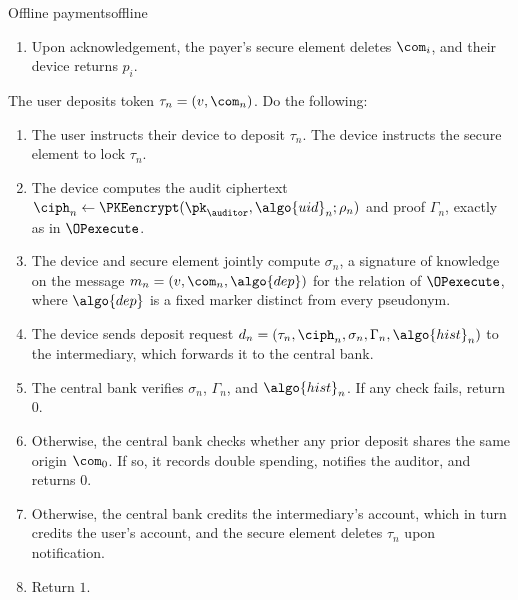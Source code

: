 \begin{protocolbox}{Offline payments}{offline}
\begin{description}
\begin{enumerate}
        \item Upon acknowledgement, the payer's secure element deletes
          $\com_i$, and their device returns $p_i$.

      \end{enumerate}

    \item[$\{0,1\} \sample \OPdeposit(\tau_n, \algo{hist}_n)$ :] The user
      deposits token $\tau_n = (v, \com_n)$. Do the following:

      \begin{enumerate}

        \item The user instructs their device to deposit $\tau_n$. The device
          instructs the secure element to lock $\tau_n$.

        \item The device computes the audit ciphertext $\ciph_n \leftarrow
          \PKEencrypt(\pk_\auditor, \algo{uid}_n; \rho_n)$ and proof
          $\Gamma_n$, exactly as in $\OPexecute$.

        \item The device and secure element jointly compute $\sigma_n$, a
          signature of knowledge on the message $m_n = (v, \com_n, \algo{dep})$
          for the relation of $\OPexecute$, where $\algo{dep}$ is a fixed
          marker distinct from every pseudonym.

        \item The device sends deposit request $d_n = (\tau_n, \ciph_n,
          \sigma_n, \Gamma_n, \algo{hist}_n)$ to the intermediary, which
          forwards it to the central bank.

        \item The central bank verifies $\sigma_n$, $\Gamma_n$, and
          $\algo{hist}_n$.  If any check fails, return $0$.

        \item Otherwise, the central bank checks whether any prior deposit
          shares the same origin $\com_0$. If so, it records double spending,
          notifies the auditor, and returns $0$.

        \item Otherwise, the central bank credits the intermediary's account,
          which in turn credits the user's account, and the secure element
          deletes $\tau_n$ upon notification.

        \item Return $1$.


\end{enumerate}
\end{description}
\end{protocolbox}
